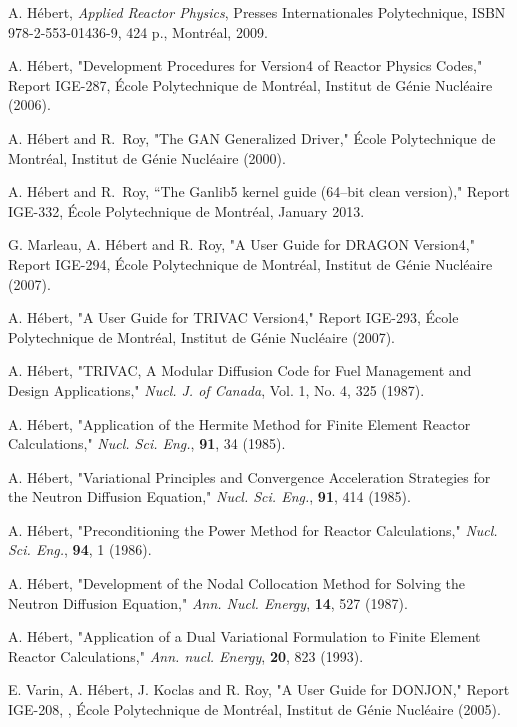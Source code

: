 \begin{thebibliography}{99}

A. H\'ebert, {\sl Applied Reactor Physics}, Presses Internationales Polytechnique,
ISBN 978-2-553-01436-9, 424 p., Montr\'eal, 2009.

A. H\'ebert, "Development Procedures for Version4 of
Reactor Physics Codes," Report IGE-287,
\'Ecole Polytechnique de Montr\'eal,
 Institut de G\'enie Nucl\'eaire (2006).

A. H\'ebert and R.~Roy, "The GAN Generalized Driver," 
\'Ecole Polytechnique de Montr\'eal,
 Institut de G\'enie Nucl\'eaire (2000).

A. H\'ebert and R.~Roy,
``The Ganlib5 kernel guide (64--bit clean version),"
Report IGE-332, \'Ecole Polytechnique de Montr\'eal, January 2013.

G. Marleau, A. H\'ebert and R. Roy,
"A User Guide for DRAGON Version4,"
Report IGE-294, \'Ecole Polytechnique de Montr\'eal,
Institut de G\'enie Nucl\'eaire (2007).

A. H\'ebert, "A User Guide for TRIVAC Version4,"
Report IGE-293, \'Ecole Polytechnique de Montr\'eal,
Institut de G\'enie Nucl\'eaire (2007).

A. H\'ebert, "TRIVAC, A Modular Diffusion Code for Fuel Management and 
Design Applications," {\sl Nucl. J. of Canada}, Vol. 1, No. 4, 325 (1987).

A. H\'ebert, "Application of the Hermite Method for Finite Element 
Reactor Calculations," {\sl Nucl. Sci. Eng.}, {\bf 91}, 34 (1985).

A. H\'ebert, "Variational Principles and Convergence Acceleration 
Strategies for the Neutron Diffusion Equation," {\sl Nucl. Sci. Eng.}, 
{\bf 91}, 414 (1985).

A. H\'ebert, "Preconditioning the Power Method for Reactor Calculations,"
{\sl Nucl. Sci. Eng.}, {\bf 94}, 1 (1986).

A. H\'ebert, "Development of the Nodal Collocation Method for Solving 
the Neutron Diffusion Equation," {\sl Ann. Nucl. Energy}, {\bf 14}, 
527 (1987).

A. H\'ebert, "Application of a Dual Variational Formulation to Finite 
Element Reactor Calculations," {\sl Ann. nucl. Energy}, {\bf 20}, 823 (1993).

E. Varin,  A. H\'ebert, J. Koclas and R. Roy, "A User Guide for DONJON,"
Report IGE-208, , \'Ecole Polytechnique de Montr\'eal,
Institut de G\'enie Nucl\'eaire (2005).


\end{thebibliography}
